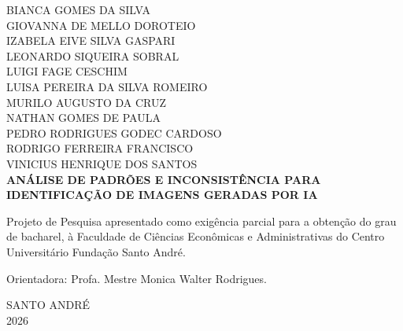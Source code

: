 \begin{titlepage}
\begin{center}
BIANCA GOMES DA SILVA\\
GIOVANNA DE MELLO DOROTEIO\\
IZABELA EIVE SILVA GASPARI\\
LEONARDO SIQUEIRA SOBRAL\\
LUIGI FAGE CESCHIM\\
LUISA PEREIRA DA SILVA ROMEIRO\\
MURILO AUGUSTO DA CRUZ\\
NATHAN GOMES DE PAULA\\
PEDRO RODRIGUES GODEC CARDOSO\\
RODRIGO FERREIRA FRANCISCO\\
VINICIUS HENRIQUE DOS SANTOS\\[3cm]

\textbf{\MakeUppercase{Análise de padrões e inconsistência para identificação
de imagens geradas por IA}}\\[3cm]
\end{center}

\hspace*{7cm}
\begin{minipage}{8cm}
\singlespacing\footnotesize\justifying
Projeto de Pesquisa apresentado como exigência parcial para a obtenção do grau
de bacharel, à Faculdade de Ciências Econômicas e Administrativas do Centro
Universitário Fundação Santo André.

\vspace{5mm}
Orientadora: Profa. Mestre Monica Walter Rodrigues.
\end{minipage}

\vfill
\begin{center}
SANTO ANDRÉ\\
2026
\end{center}
\end{titlepage}

